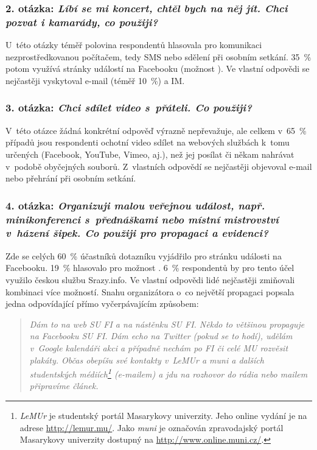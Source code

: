 \documentclass[12pt,oneside,final]{fithesis2}
\begin{document}
\subsubsection*{\textbf{2. otázka:} \emph{Líbí se mi koncert, chtěl bych na něj jít. Chci pozvat i kamarády, co použiji?}}
U~této otázky téměř polovina respondentů hlasovala pro komunikaci nezprostředkovanou počítačem, tedy SMS nebo sdělení při osobním setkání. 35~\% potom využívá stránky událostí na Facebooku (možnost ). Ve vlastní odpovědi se nejčastěji vyskytoval e-mail (téměř 10~\%) a IM.

\subsubsection*{\textbf{3. otázka:} \emph{Chci sdílet video s~přáteli. Co použiji?}}
V~této otázce žádná konkrétní odpověď výrazně nepřevažuje, ale celkem v~65~\% případů jsou respondenti ochotní video sdílet na webových službách k~tomu určených (Facebook, YouTube, Vimeo, aj.), než jej posílat či někam nahrávat v~podobě obyčejných souborů. Z~vlastních odpovědí se nejčastěji objevoval e-mail nebo přehrání při osobním setkání.

\subsubsection*{\textbf{4. otázka:} \emph{Organizuji malou veřejnou událost, např. minikonferenci s~přednáškami nebo místní mistrovství v~házení šipek. Co použiji pro propagaci a evidenci?}}\label{propagationOfEventQuote}
Zde se celých 60~\% účastníků dotazníku vyjádřilo pro stránku události na Facebooku. 19~\% hlasovalo pro možnost . 6~\% respondentů by pro tento účel využilo českou službu Srazy.info. Ve vlastní odpovědi lidé nejčastěji zmiňovali kombinaci více možností. Snahu organizátora o~co největší propagaci popsala jedna odpovídající přímo vyčerpávajícím způsobem:

\begin{quotation}
    \emph{Dám to na web SU FI a na nástěnku SU FI. Někdo to většinou propaguje na Facebooku SU FI. Dám echo na Twitter (pokud se to hodí), udělám v~Google kalendáři akci a případně nechám po FI či celé MU rozvěsit plakáty. Občas obepíšu své kontakty v~LeMUr a muni a dalších studentských médiích\footnote{\emph{LeMUr} je studentský portál Masarykovy univerzity. Jeho online vydání je na adrese \url{http://lemur.mu/}. Jako \emph{muni} je označován zpravodajský portál Masarykovy univerzity dostupný na \url{http://www.online.muni.cz/}.} (e-mailem) a jdu na rozhovor do rádia nebo mailem připravíme článek.}
\end{quotation}
\end{document}
